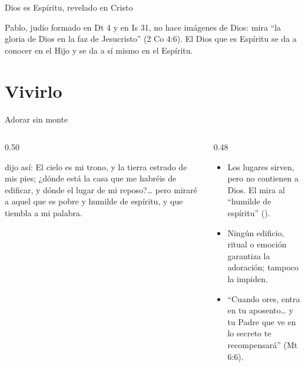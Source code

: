 \begin{frame}{Dios es Espíritu, revelado en Cristo}
\centering
{}\par\medskip
\small\RaggedRight Pablo, judío formado en Dt 4 y en Is 31, no hace imágenes de Dios: mira ``la gloria de Dios en la faz de Jesucristo'' (2 Co 4:6). El Dios que es Espíritu se da a conocer en el Hijo y se da a sí mismo en el Espíritu.
\end{frame}

\section{Vivirlo}

\begin{frame}{Adorar sin monte}
\begin{columns}[t,onlytextwidth]
\begin{column}{0.50\textwidth}
\begin{cita}\SENOR{} dijo así: El cielo es mi trono, y la tierra estrado de mis pies; ¿dónde está la casa que me habréis de edificar, y dónde el lugar de mi reposo?\ldots{} pero miraré a aquel que es pobre y humilde de espíritu, y que tiembla a mi palabra.\end{cita}
\end{column}
\begin{column}{0.48\textwidth}\small
\begin{itemize}
\item Los lugares sirven, pero no contienen a Dios. El \SENOR{} mira al ``humilde de espíritu'' ().
\item Ningún edificio, ritual o emoción garantiza la adoración; tampoco la impiden.
\item ``Cuando ores, entra en tu aposento\ldots{} y tu Padre que ve en lo secreto te recompensará'' (Mt 6:6).
\end{itemize}
\end{column}
\end{columns}
\end{frame}

